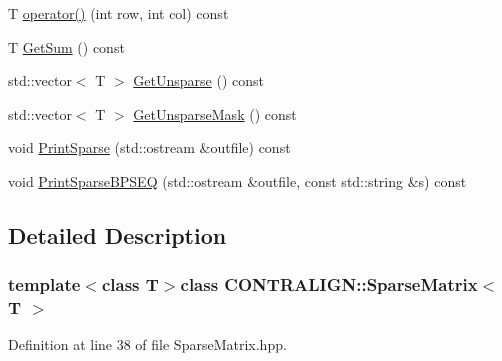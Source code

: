 \begin{DoxyCompactItemize}
\item 
T \hyperlink{class_c_o_n_t_r_a_l_i_g_n_1_1_sparse_matrix_ad8053dc37c78543b50b9f72ac0628e50}{operator()} (int row, int col) const 
\item 
T \hyperlink{class_c_o_n_t_r_a_l_i_g_n_1_1_sparse_matrix_a02b62e846e2410a66932b340ea7d7305}{Get\+Sum} () const 
\item 
std\+::vector$<$ T $>$ \hyperlink{class_c_o_n_t_r_a_l_i_g_n_1_1_sparse_matrix_a253f2ead727aa10eb74d0e1beab66bdd}{Get\+Unsparse} () const 
\item 
std\+::vector$<$ T $>$ \hyperlink{class_c_o_n_t_r_a_l_i_g_n_1_1_sparse_matrix_a44399ef13fa7df1d42226013f1c6d453}{Get\+Unsparse\+Mask} () const 
\item 
void \hyperlink{class_c_o_n_t_r_a_l_i_g_n_1_1_sparse_matrix_a3db5914e4a3da5f5a05cf66ca4c281e1}{Print\+Sparse} (std\+::ostream \&outfile) const 
\item 
void \hyperlink{class_c_o_n_t_r_a_l_i_g_n_1_1_sparse_matrix_a899db1a83f5d4882a26c61b3644db0f0}{Print\+Sparse\+B\+P\+S\+E\+Q} (std\+::ostream \&outfile, const std\+::string \&s) const 
\end{DoxyCompactItemize}


\subsection{Detailed Description}
\subsubsection*{template$<$class T$>$class C\+O\+N\+T\+R\+A\+L\+I\+G\+N\+::\+Sparse\+Matrix$<$ T $>$}



Definition at line 38 of file Sparse\+Matrix.\+hpp.



